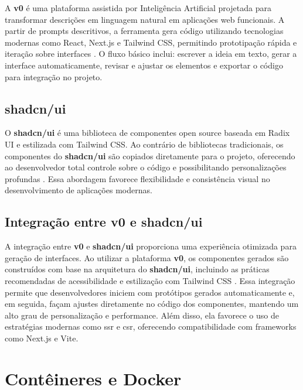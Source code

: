 A \textbf{v0} é uma plataforma assistida por Inteligência Artificial projetada para transformar descrições em linguagem natural em aplicações web funcionais. A partir de prompts descritivos, a ferramenta gera código utilizando tecnologias modernas como React, Next.js e Tailwind CSS, permitindo prototipação rápida e iteração sobre interfaces \cite{v0_docs}. O fluxo básico inclui: escrever a ideia em texto, gerar a interface automaticamente, revisar e ajustar os elementos e exportar o código para integração no projeto.

\subsection{shadcn/ui}
\label{subsec:shadcn}

O \textbf{shadcn/ui} é uma biblioteca de componentes open source baseada em Radix UI e estilizada com Tailwind CSS. Ao contrário de bibliotecas tradicionais, os componentes do \textbf{shadcn/ui} são copiados diretamente para o projeto, oferecendo ao desenvolvedor total controle sobre o código e possibilitando personalizações profundas \cite{shadcn_docs}. Essa abordagem favorece flexibilidade e consistência visual no desenvolvimento de aplicações modernas.

\subsection{Integração entre v0 e shadcn/ui}
\label{subsec:integracao-v0-shadcn}

A integração entre \textbf{v0} e \textbf{shadcn/ui} proporciona uma experiência otimizada para geração de interfaces. Ao utilizar a plataforma \textbf{v0}, os componentes gerados são construídos com base na arquitetura do \textbf{shadcn/ui}, incluindo as práticas recomendadas de acessibilidade e estilização com Tailwind CSS \cite{v0_docs, shadcn_docs}. Essa integração permite que desenvolvedores iniciem com protótipos gerados automaticamente e, em seguida, façam ajustes diretamente no código dos componentes, mantendo um alto grau de personalização e performance. Além disso, ela favorece o uso de estratégias modernas como \acrshort{ssr} e \acrshort{csr}, oferecendo compatibilidade com frameworks como Next.js e Vite.


\section{Contêineres e Docker}
\label{cap:docker}

